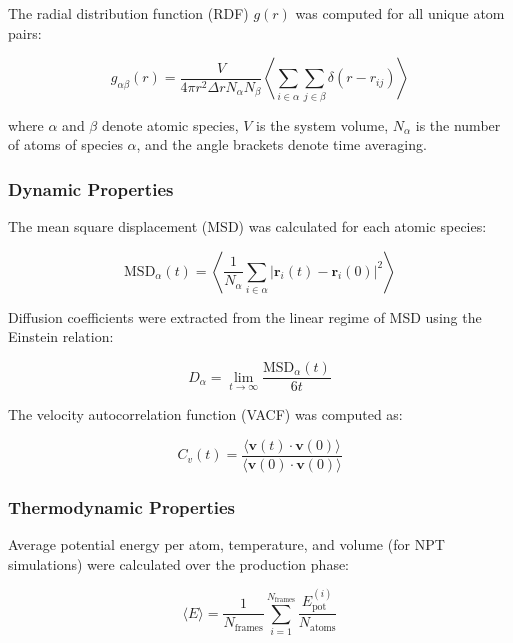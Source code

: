 \documentclass[pdflatex,sn-mathphys-num]{sn-jnl}%
\theoremstyle{thmstyleone}%
\theoremstyle{thmstyletwo}%
\theoremstyle{thmstylethree}%
\begin{document}
The radial distribution function (RDF) $g(r)$ was computed for all unique atom pairs:

\begin{equation}
g_{\alpha\beta}(r) = \frac{V}{4\pi r^2 \Delta r N_\alpha N_\beta} \left\langle \sum_{i \in \alpha} \sum_{j \in \beta} \delta(r - r_{ij}) \right\rangle
\end{equation}

where $\alpha$ and $\beta$ denote atomic species, $V$ is the system volume, $N_\alpha$ is the number of atoms of species $\alpha$, and the angle brackets denote time averaging.

\subsubsection{Dynamic Properties}

The mean square displacement (MSD) was calculated for each atomic species:

\begin{equation}
\text{MSD}_\alpha(t) = \left\langle \frac{1}{N_\alpha} \sum_{i \in \alpha} |\mathbf{r}_i(t) - \mathbf{r}_i(0)|^2 \right\rangle
\end{equation}

Diffusion coefficients were extracted from the linear regime of MSD using the Einstein relation:

\begin{equation}
D_\alpha = \lim_{t \to \infty} \frac{\text{MSD}_\alpha(t)}{6t}
\end{equation}

The velocity autocorrelation function (VACF) was computed as:

\begin{equation}
C_v(t) = \frac{\langle \mathbf{v}(t) \cdot \mathbf{v}(0) \rangle}{\langle \mathbf{v}(0) \cdot \mathbf{v}(0) \rangle}
\end{equation}

\subsubsection{Thermodynamic Properties}

Average potential energy per atom, temperature, and volume (for NPT simulations) were calculated over the production phase:

\begin{equation}
\langle E \rangle = \frac{1}{N_{\text{frames}}} \sum_{i=1}^{N_{\text{frames}}} \frac{E_{\text{pot}}^{(i)}}{N_{\text{atoms}}}
\end{equation}
\end{document}
